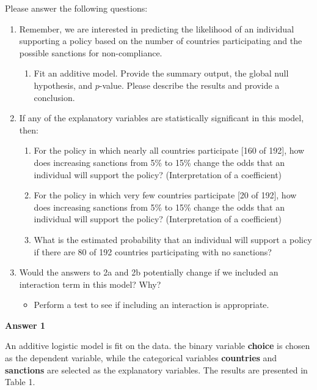 \documentclass[12pt,letterpaper]{article}
\begin{document}
\newpage
\noindent Please answer the following questions:

\begin{enumerate}
	\item
	Remember, we are interested in predicting the likelihood of an individual supporting a policy based on the number of countries participating and the possible sanctions for non-compliance.
	\begin{enumerate}
		\item [] Fit an additive model. Provide the summary output, the global null hypothesis, and $p$-value. Please describe the results and provide a conclusion.

	\end{enumerate}
	
	\item
	If any of the explanatory variables are statistically significant in this model, then:
	\begin{enumerate}
		\item
		For the policy in which nearly all countries participate [160 of 192], how does increasing sanctions from 5\% to 15\% change the odds that an individual will support the policy? (Interpretation of a coefficient)
		\item
		For the policy in which very few countries participate [20 of 192], how does increasing sanctions from 5\% to 15\% change the odds that an individual will support the policy? (Interpretation of a coefficient)
		\item
		What is the estimated probability that an individual will support a policy if there are 80 of 192 countries participating with no sanctions? 
	
	\end{enumerate}
	\item
	Would the answers to 2a and 2b potentially change if we included an interaction term in this model? Why? 
	\begin{itemize}
		\item Perform a test to see if including an interaction is appropriate.
	\end{itemize}
	\end{enumerate}

\vspace{2cm}

\noindent\textbf{Answer 1}\\
\vspace{0.5cm}

\noindent An additive logistic model is fit on the data. the binary variable \textbf{choice} is chosen as the dependent variable, while the categorical variables \textbf{countries} and \textbf{sanctions} are selected as the explanatory variables. The results are presented in Table 1.
\end{document}
